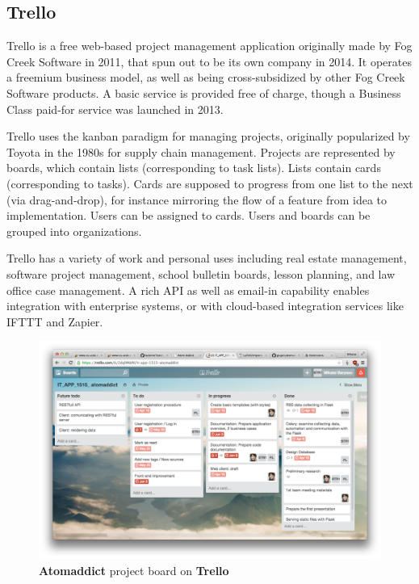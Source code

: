 \documentclass[12pt]{article}
\begin{document}
\subsection{Trello}
Trello is a free web-based project management application originally made by Fog Creek Software in 2011, that spun out to be its own company in 2014.
It operates a freemium business model, as well as being cross-subsidized by other Fog Creek Software products. A basic service is provided free of charge, though a Business Class paid-for service was launched in 2013.

Trello uses the kanban paradigm for managing projects, originally popularized by Toyota in the 1980s for supply chain management. Projects are represented by boards, which contain lists (corresponding to task lists). Lists contain cards (corresponding to tasks). Cards are supposed to progress from one list to the next (via drag-and-drop), for instance mirroring the flow of a feature from idea to implementation. Users can be assigned to cards. Users and boards can be grouped into organizations.

Trello has a variety of work and personal uses including real estate management, software project management, school bulletin boards, lesson planning, and law office case management. A rich API as well as email-in capability enables integration with enterprise systems, or with cloud-based integration services like IFTTT and Zapier.~\cite{wiki:trello}

\begin{figure}[H]
    \centering
    \includegraphics[width=\textwidth]{images/trello.png}
    \caption{\textbf{Atomaddict} project board on \textbf{Trello}}
    \label{fig:trello}
\end{figure}
\end{document}
